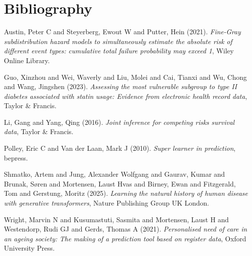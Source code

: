\documentclass[11pt]{article}
\begin{document}
\newpage
\section{Bibliography}
\label{sec:orga901f99}
\noindent
Austin, Peter C and Steyerberg, Ewout W and Putter, Hein (2021). \emph{Fine-Gray subdistribution hazard models to simultaneously estimate the absolute risk of different event types: cumulative total failure probability may exceed 1}, Wiley Online Library.

\noindent
Guo, Xinzhou and Wei, Waverly and Liu, Molei and Cai, Tianxi and Wu, Chong and Wang, Jingshen (2023). \emph{Assessing the most vulnerable subgroup to type II diabetes associated with statin usage: Evidence from electronic health record data}, Taylor \& Francis.

\noindent
Li, Gang and Yang, Qing (2016). \emph{Joint inference for competing risks survival data}, Taylor \& Francis.

\noindent
Polley, Eric C and Van der Laan, Mark J (2010). \emph{Super learner in prediction}, bepress.

\noindent
Shmatko, Artem and Jung, Alexander Wolfgang and Gaurav, Kumar and Brunak, S{\o}ren and Mortensen, Laust Hvas and Birney, Ewan and Fitzgerald, Tom and Gerstung, Moritz (2025). \emph{Learning the natural history of human disease with generative transformers}, Nature Publishing Group UK London.

\noindent
Wright, Marvin N and Kusumastuti, Sasmita and Mortensen, Laust H and Westendorp, Rudi GJ and Gerds, Thomas A (2021). \emph{Personalised need of care in an ageing society: The making of a prediction tool based on register data}, Oxford University Press.
\end{document}
